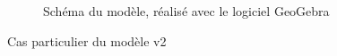 \documentclass[11pt,a4paper]{article}
\begin{document}
\begin{figure}[H] 
\caption{Schéma du modèle, réalisé avec le logiciel GeoGebra}
\end{figure}

Cas particulier du modèle v2
\end{document}
